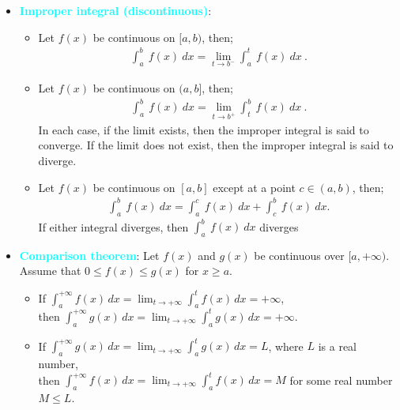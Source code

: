 \documentclass{report}
\begin{document}
\begin{itemize}
        \item \textbf{\textcolor{cyan}{Improper integral (discontinuous)}}:
            \begin{itemize}
                \item Let $f(x)$ be continuous on $[a,b)$, then;
                    \begin{align*}
                        \int_{a}^{b}\ f(x)\ dx = \lim\limits_{t \to b^{-}}{\int_{a}^{t}\ f(x)\ dx}\
                    .\end{align*}
                \item Let $f(x)$ be continuous on $(a,b]$, then;
                    \begin{align*}
                        \int_{a}^{b}\ f(x)\ dx = \lim\limits_{t \to b^{+}}{\int_{t}^{b}\ f(x)\ dx}\
                    .\end{align*}
                    In each case, if the limit exists, then the improper integral is said to converge. If the limit does not exist, then the improper integral is said to diverge.
                \item Let $f(x)$ be continuous on $[a,b]$ except at a point $c \in (a,b)$, then;
                    \begin{align*}
                        \int_{a}^{b}\ f(x)\ dx = \int_{a}^{c}\ f(x)\ dx  +\int_{c}^{b}\ f(x)\ dx
                    .\end{align*}
                    If either integral diverges, then $\int_{a}^{b}\ f(x)\ dx $ diverges
            \end{itemize}
        \item \textbf{\textcolor{cyan}{Comparison theorem}}:
            Let $f(x)$ and $g(x)$ be continuous over $[a,+\infty)$. Assume that $0 \leq f(x) \leq g(x)$ for $x \geq a$.
            \begin{itemize}
                \item If $\int_a^{+\infty} f(x) \, dx = \lim_{t \to +\infty} \int_a^t f(x) \, dx = +\infty$,  \\
                    then $\int_a^{+\infty} g(x) \, dx = \lim_{t \to +\infty} \int_a^t g(x) \, dx = +\infty$.
                \item If $\int_a^{+\infty} g(x) \, dx = \lim_{t \to +\infty} \int_a^t g(x) \, dx = L$, where $L$ is a real number,  \\
                    then $\int_a^{+\infty} f(x) \, dx = \lim_{t \to +\infty} \int_a^t f(x) \, dx = M$ for some real number $M \leq L$.
            \end{itemize}

\end{itemize}
\end{document}
